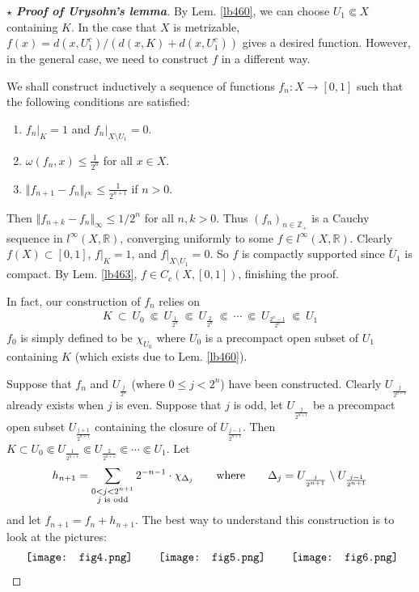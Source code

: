 \documentclass[12pt,b5paper,notitlepage]{article}
\theoremstyle{definition}
\theoremstyle{plain}
\newcommand{\ovl}{\overline}
\newcommand{\Zbb}{\mathbb Z}
\newcommand{\Rbb}{\mathbb R}
\numberwithin{equation}{section}
\begin{document}
\begin{proof}[$\star$ \textbf{Proof of Urysohn's lemma}]
By Lem. \ref{lb460}, we can choose $U_1\Subset X$ containing $K$. In the case that $X$ is metrizable, $f(x)=d(x,U_1^c)/(d(x,K)+d(x,U_1^c))$ gives a desired function. However, in the general case, we need to construct $f$ in a different way. 

We shall construct inductively a sequence of functions $f_n:X\rightarrow[0,1]$ such that the following conditions are satisfied:
\begin{enumerate}[label=(\alph*)]
\item $f_n|_K=1$ and $f_n|_{X\setminus U_1}=0$.
\item $\omega(f_n,x)\leq \frac 1{2^n}$ for all $x\in X$.
\item $\Vert f_{n+1}-f_n\Vert_{l^\infty}\leq \frac 1{2^{n+1}}$ if $n>0$.
\end{enumerate}
Then $\Vert f_{n+k}-f_n\Vert_\infty\leq 1/2^n$ for all $n,k>0$. Thus $(f_n)_{n\in\Zbb_+}$ is a Cauchy sequence in $l^\infty(X,\Rbb)$, converging uniformly to some $f\in l^\infty(X,\Rbb)$. Clearly $f(X)\subset[0,1]$, $f|_K=1$, and $f|_{X\setminus U_1}=0$. So $f$ is compactly supported since $\ovl U_1$ is compact. By Lem. \ref{lb463}, $f\in C_c(X,[0,1])$, finishing the proof.

In fact, our construction of $f_n$ relies on
\begin{align*}
K~\subset~ U_0~\Subset~ U_{\frac 1{2^n}}~\Subset~ U_{\frac 2{2^n}}~\Subset~\cdots~\Subset ~U_{\frac{2^{n}-1}{2^n}}~\Subset ~U_1
\end{align*}
$f_0$ is simply defined to be $\chi_{U_0}$ where $U_0$ is a precompact open subset of $U_1$ containing $K$ (which exists due to Lem. \ref{lb460}). 

Suppose that $f_n$ and $U_{\frac j{2^n}}$ (where $0\leq j<2^n$) have been constructed. Clearly $U_{\frac j{2^{n+1}}}$ already exists when $j$ is even. Suppose that $j$ is odd, let $U_{\frac j{2^{n+1}}}$ be a precompact open subset $U_{\frac {j+1}{2^{n+1}}}$ containing the closure of  $U_{\frac {j-1}{2^{n+1}}}$. Then $K\subset U_0\Subset U_{\frac 1{2^{n+1}}}\Subset U_{\frac 2{2^{n+1}}}\Subset\cdots\Subset U_1$. Let
\begin{align*}
h_{n+1}=\sum_{
\begin{subarray}{c}
0<j<2^{n+1}\\
j\text{ is odd}
\end{subarray}
}2^{-n-1}\cdot\chi_{\Delta_j}\qquad\text{where}\qquad \Delta_j=U_{\frac j{2^{n+1}}}\setminus U_{\frac{j-1}{2^{n+1}}}
\end{align*}
and let $f_{n+1}=f_n+h_{n+1}$. The best way to understand this construction is to look at the pictures:
\begin{gather*}
\vcenter{\hbox{{
			\texttt{[image: fig4.png]}}}}
\qquad
\vcenter{\hbox{{
			\texttt{[image: fig5.png]}}}}
\qquad
\vcenter{\hbox{{
			\texttt{[image: fig6.png]}}}}
\end{gather*}



\end{proof}
\end{document}
